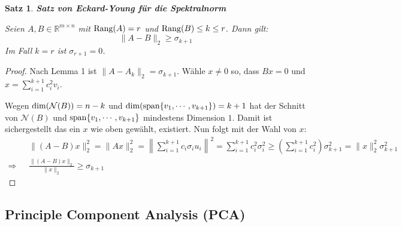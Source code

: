 \documentclass{article}
\newcommand{\R}[0]{\mathbb{R}}
\newtheorem{thm}{Satz}
\begin{document}
\begin{thm} \textbf{Satz von Eckard-Young für die Spektralnorm}

    Seien $A, B \in \R^{m \times n}$ mit ${\rm Rang}(A) = r$ und ${\rm Rang}(B) \leq k \leq r$. Dann gilt:
    \begin{equation}
        \lVert A - B \rVert_2 \geq \sigma_{k+1}
    \end{equation}
    Im Fall $k = r$ ist $\sigma_{r+1} = 0$.
\end{thm}

\begin{proof}
    Nach Lemma 1 ist $\lVert A - A_k \rVert_2 = \sigma_{k+1}$. Wähle $x \neq 0$ so, dass $Bx = 0$ und $x = \sum\limits_{i=1}^{k+1} c_i^2v_i$.

    Wegen ${\rm dim}(\mathcal{N}(B)) = n - k$ und ${\rm dim}({\rm span}\{v_1, \cdots, v_{k+1}\}) = k + 1$ hat der Schnitt von $\mathcal{N}(B)$ und ${\rm span}\{v_1, \cdots, v_{k+1}\}$ mindestens Dimension $1$. 
    Damit ist sichergestellt das ein $x$ wie oben gewählt, existiert. Nun folgt mit der Wahl von $x$:
    \begin{align*}
        &\lVert(A-B)x\rVert_2^2 = \lVert Ax \rVert^2_2 = \left\lVert \sum\limits_{i=1}^{k+1} c_i\sigma_i u_i \right\rVert^2 = \sum\limits_{i=1}^{k+1}c_i^2\sigma_i^2 \geq \left(\sum\limits_{i=1}^{k+1}c_i^2\right)\sigma_{k+1}^2 = \lVert x \rVert_2^2 \sigma_{k+1}^2 \\
    \Rightarrow \:\:\: &\frac{\lVert (A - B)x \rVert_2}{\lVert x \rVert_2} \geq \sigma_{k+1}
    \end{align*}
\end{proof}

\subsection{Principle Component Analysis (PCA)}
\end{document}

